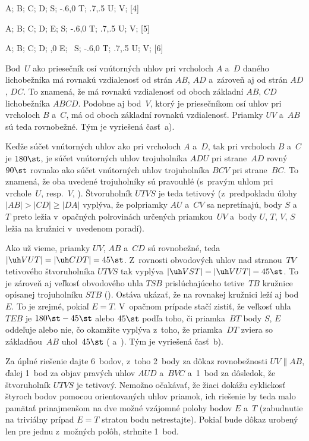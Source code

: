 {%
\fontplace
\tpoint A; \tpoint B; \bpoint C; \bpoint D;
\bpoint S; \tpoint\xy-.6,0 T; \bpoint\xy.7,.5 U; \bpoint V;
[4] \hfil\Obr

\fontplace
\tpoint A; \tpoint B; \bpoint C; \bpoint D; \tpoint E;
\bpoint S; \tpoint\xy-.6,0 T; \bpoint\xy.7,.5 U; \bpoint V;
[5] \hfil\Obr

\fontplace
\tpoint A; \tpoint B; \bpoint C; \bpoint D; \tpoint{},0 E;
\bpoint\, S; \tpoint\xy-.6,0 T; \bpoint\xy.7,.5 U; \bpoint V;
[6] \hfil\Obr

Bod~$U$ ako priesečník osí vnútorných uhlov pri vrcholoch $A$ a~$D$
daného lichobežníka má rovnakú vzdialenosť od strán $AB$, $AD$ 
a~zároveň aj od strán $AD$, $DC$. To znamená, že má rovnakú
vzdialenosť od oboch základní $AB$, $CD$ lichobežníka $ABCD$.
Podobne aj bod~$V$, ktorý je priesečníkom osí uhlov pri vrcholoch $B$
a~$C$, má od oboch základní rovnakú vzdialenosť. Priamky
$UV$ a~$AB$ sú teda rovnobežné. Tým je vyriešená časť~a).

Keďže súčet vnútorných uhlov ako pri vrcholoch $A$ a~$D$, tak
pri vrcholoch $B$ a~$C$ je $180\st$, je súčet vnútorných uhlov
trojuholníka $ADU$ pri strane~$AD$ rovný $90\st$ rovnako ako súčet vnútorných uhlov
trojuholníka $BCV$ pri strane~$BC$. To znamená, že oba uvedené
trojuholníky sú pravouhlé (s~pravým uhlom pri vrchole~$U$, resp.~$V$,
\obr). Štvoruholník $UTVS$ je teda tetivový (z~predpokladu úlohy
$|AB|>|CD|\ge|DA|$ vyplýva, že polpriamky $AU$ a~$CV$ sa
nepretínajú, body $S$ a~$T$ preto ležia v~opačných polrovinách
určených priamkou~$UV$ a~body $U$, $T$, $V$, $S$ ležia na kružnici
v~uvedenom poradí).

\inspicture

Ako už vieme, priamky $UV$, $AB$ a~$CD$ sú rovnobežné, teda
$|\uh VUT|=|\uh CDT|=45\st$. Z~rovnosti obvodových uhlov
nad stranou~$TV$ tetivového štvoruholníka $UTVS$ tak vyplýva
$|\uh VST|=|\uh VUT|=45\st$. To je zároveň aj veľkosť obvodového uhla
$TSB$ prislúchajúceho tetive~$TB$ kružnice opísanej trojuholníku $STB$ (\obr).
Ostáva ukázať, že na rovnakej kružnici leží aj bod~$E$. To je zrejmé,
pokiaľ $E=T$. V~opačnom prípade stačí zistiť, že veľkosť uhla
$TEB$ je $180\st-45\st$ alebo $45\st$ podľa toho, či priamka~$BT$
body $S$, $E$ oddeľuje alebo nie, čo okamžite vyplýva z~toho, že
priamka~$DT$ zviera so základňou~$AB$ uhol~$45\st$ (
a~\obrnum). Tým je vyriešená časť~b).

\twocpictures

\nobreak\medskip\petit\noindent
Za úplné riešenie dajte 6~bodov, z~toho 2~body za dôkaz
rovnobežnosti $UV\parallel AB$, ďalej 1~bod za objav pravých uhlov
$AUD$ a~$BVC$ a~1~bod za dôsledok, že štvoruholník $UTVS$ je
tetivový. Nemožno očakávať, že žiaci dokážu cyklickosť
štyroch bodov pomocou orientovaných uhlov priamok, ich riešenie by teda
malo pamätať prinajmenšom na dve možné vzájomné polohy bodov $E$
a~$T$ (zabudnutie na triviálny prípad $E=T$ stratou bodu
netrestajte). Pokiaľ bude dôkaz urobený len pre jednu z~možných
polôh, strhnite 1~bod.

\endpetit
\bigbreak
}

